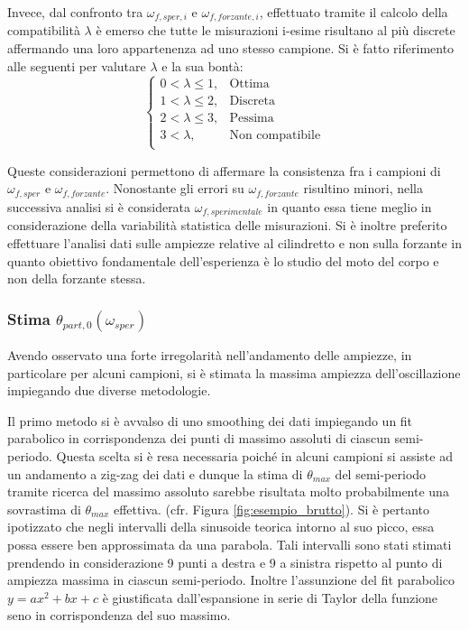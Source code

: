 \documentclass[a4paper,11pt,oneside]{article}
\begin{document}
Invece, dal confronto tra $\omega_{f, sper, i}$ e $\omega_{f, forzante, i}$, effettuato tramite il calcolo della compatibilità $\lambda$ è emerso che tutte le misurazioni i-esime risultano al più discrete affermando una loro appartenenza ad uno stesso campione.
Si è fatto riferimento alle seguenti per valutare $\lambda$ e la sua bontà:
\begin{equation*}%
    \label{eq:cases}
    \begin{cases}
    0<\lambda\leq 1, & \text{Ottima}\\
    1<\lambda\leq2, & \text{Discreta}\\
    2<\lambda\leq3, & \text{Pessima}\\
    3<\lambda, & \text{Non compatibile}\\
    \end{cases}
\end{equation*}

Queste considerazioni permettono di affermare la consistenza fra i campioni di $\omega_{f, sper}$ e $\omega_{f, forzante}$. Nonostante gli errori su $\omega_{f, forzante}$ risultino minori, nella successiva analisi si è considerata $\omega_{f, sperimentale}$ in quanto essa tiene meglio in considerazione della variabilità statistica delle misurazioni.
Si è inoltre preferito effettuare l'analisi dati sulle ampiezze relative al cilindretto e non sulla forzante in quanto obiettivo fondamentale dell'esperienza è lo studio del moto del corpo e non della forzante stessa.

\subsubsection{Stima $\theta_{part, 0}(\omega_{sper})$}
Avendo osservato una forte irregolarità nell'andamento delle ampiezze, in particolare per alcuni campioni, si è stimata la massima ampiezza dell'oscillazione impiegando due diverse metodologie.\newline

Il primo metodo si è avvalso di uno smoothing dei dati impiegando un fit parabolico in corrispondenza dei punti di massimo assoluti di ciascun semi-periodo. Questa scelta si è resa necessaria poiché in alcuni campioni si assiste ad un andamento a zig-zag dei dati e dunque la stima di $\theta_{max}$ del semi-periodo tramite ricerca del massimo assoluto sarebbe risultata molto probabilmente una sovrastima di $\theta_{max}$ effettiva. (cfr. Figura \ref{fig:esempio_brutto}).
Si è pertanto ipotizzato che negli intervalli della sinusoide teorica intorno al suo picco, essa possa essere ben approssimata da una parabola. Tali intervalli sono stati stimati prendendo in considerazione 9 punti a destra e 9 a sinistra rispetto al punto di ampiezza massima in ciascun semi-periodo. Inoltre l'assunzione del fit parabolico $y = a x^2 + b x + c$ è giustificata dall'espansione in serie di Taylor della funzione seno in corrispondenza del suo massimo.
\end{document}
